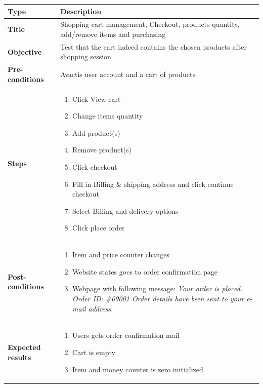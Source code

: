 \documentclass[UKenglish,12pt]{article}
\begin{document}
\begin{itemize}
\begin{table}[!htbp]
\small
\begin{tabular}{| p{5cm} | p{10cm} | }
	\hline
	\textbf{Type} & \textbf{Description} \\ \hline
	 \textbf{Title} & Shopping cart management, Checkout, products quantity, add/remove items and purchasing \\ \hline
	 \textbf{Objective} & Test that the cart indeed contains the chosen products after shopping session \\ \hline
	 \textbf{Pre-conditions} & Avactis user account and a cart of products \\ \hline
	 \textbf{Steps} & \begin{enumerate} \item Click View cart \item Change items quantity \item Add product(s) \item Remove product(s) \item Click checkout \item Fill in Billing \& shipping address and click continue checkout \item Select Billing and delivery options \item Click place order
	 \end{enumerate} \\ \hline
	\textbf{Post-conditions} & \begin{enumerate}\item Item and price counter changes \item Website states goes to order confirmation page \item Webpage with following message: \textit{Your order is placed. Order ID: \#00001 Order details have been sent to your e-mail address.}  \end{enumerate} \\ \hline
	 \textbf{Expected results} & \begin{enumerate}\item Users gets order confirmation mail \item Cart is empty \item Item and money counter is zero initialized \end{enumerate}\\ 
	 \hline
\end{tabular} %
\end{table}


\end{itemize}
\end{document}
